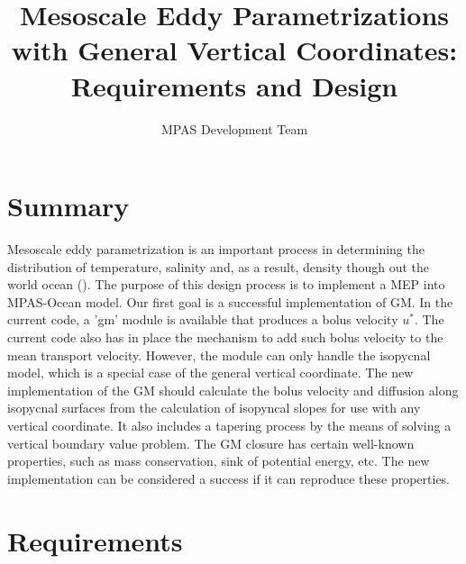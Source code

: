 \documentclass[12pt]{report}
\begin{document}
\title{Mesoscale Eddy Parametrizations \\
with General Vertical Coordinates: \\
Requirements and Design}
\author{MPAS Development Team}

\maketitle
\tableofcontents


\chapter{Summary}

Mesoscale eddy parametrization is an important process in determining the distribution of temperature, salinity and, as a result, density though out the world ocean (\cite{GentMc90, GWMMc95, Gent20}). The purpose of this design process is to implement a MEP into MPAS-Ocean model. Our first goal is a successful implementation of GM.
In the current code, a 'gm' module is available that produces 
a bolus velocity $u^\ast$. The current code also has in place 
the mechanism to add such bolus velocity to the mean transport 
velocity. However, the module can only handle the isopycnal model, 
which is a special case of the general vertical 
coordinate. The new implementation of the GM should calculate 
the bolus velocity and diffusion along isopycnal surfaces from the calculation of isopyncal slopes for use with any vertical coordinate.  
It also includes a tapering process by the means of solving a
vertical boundary value problem. The GM closure has certain well-known
properties, such as mass conservation, sink of potential energy, etc.
The new implementation can be considered a success if it can reproduce
these properties.






\chapter{Requirements}
\end{document}
